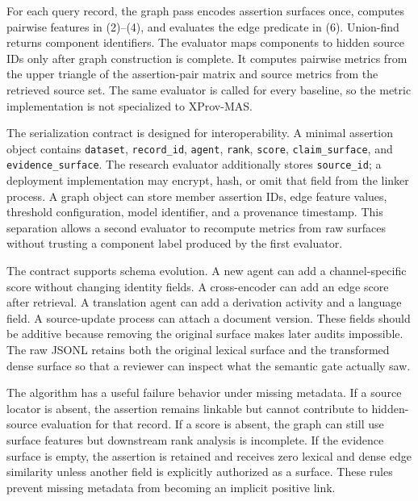 \documentclass{ieeeaccess}
\begin{document}
For each query record, the graph pass encodes assertion surfaces once, computes pairwise features in (2)--(4), and evaluates the edge predicate in (6). Union-find returns component identifiers. The evaluator maps components to hidden source IDs only after graph construction is complete. It computes pairwise metrics from the upper triangle of the assertion-pair matrix and source metrics from the retrieved source set. The same evaluator is called for every baseline, so the metric implementation is not specialized to XProv-MAS.

The serialization contract is designed for interoperability. A minimal assertion object contains \texttt{dataset}, \texttt{record\_id}, \texttt{agent}, \texttt{rank}, \texttt{score}, \texttt{claim\_surface}, and \texttt{evidence\_surface}. The research evaluator additionally stores \texttt{source\_id}; a deployment implementation may encrypt, hash, or omit that field from the linker process. A graph object can store member assertion IDs, edge feature values, threshold configuration, model identifier, and a provenance timestamp. This separation allows a second evaluator to recompute metrics from raw surfaces without trusting a component label produced by the first evaluator.

The contract supports schema evolution. A new agent can add a channel-specific score without changing identity fields. A cross-encoder can add an edge score after retrieval. A translation agent can add a derivation activity and a language field. A source-update process can attach a document version. These fields should be additive because removing the original surface makes later audits impossible. The raw JSONL retains both the original lexical surface and the transformed dense surface so that a reviewer can inspect what the semantic gate actually saw.

The algorithm has a useful failure behavior under missing metadata. If a source locator is absent, the assertion remains linkable but cannot contribute to hidden-source evaluation for that record. If a score is absent, the graph can still use surface features but downstream rank analysis is incomplete. If the evidence surface is empty, the assertion is retained and receives zero lexical and dense edge similarity unless another field is explicitly authorized as a surface. These rules prevent missing metadata from becoming an implicit positive link.
\end{document}
